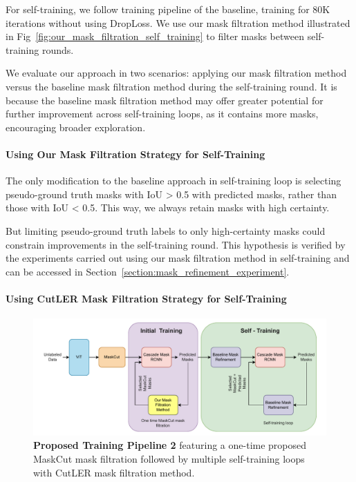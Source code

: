 For self-training, we follow training pipeline of the baseline, training for 80K iterations without using DropLoss. We use our mask filtration method illustrated in Fig~\ref{fig:our_mask_filtration_self_training} to filter masks between self-training rounds. 
 
We evaluate our approach in two scenarios: applying our mask filtration method versus the baseline mask filtration method during the self-training round. It is because the baseline mask filtration method may offer greater potential for further improvement across self-training loops, as it contains more masks, encouraging broader exploration.
 
\paragraph{Using Our Mask Filtration Strategy for Self-Training}
\label{para:our_mask_filtration}
The only modification to the baseline approach in self-training loop is selecting pseudo-ground truth masks with IoU > 0.5 with predicted masks, rather than those with IoU < 0.5. This way, we always retain masks with high certainty. 

But limiting pseudo-ground truth labels to only high-certainty masks could constrain improvements in the self-training round. This hypothesis is verified by the experiments carried out using our mask filtration method in self-training and can be accessed in Section~\ref{section:mask_refinement_experiment}.
 
\paragraph{Using CutLER Mask Filtration Strategy for Self-Training}
\begin{figure}
	\centering
	\includegraphics[width=1\textwidth]{Images/main/our_approach.pdf}
	\caption[\textbf{Proposed Training Pipeline 2}]{\textbf{Proposed Training Pipeline 2} featuring a one-time proposed MaskCut mask filtration followed by multiple self-training loops with CutLER mask filtration method.}
	\label{fig:proposed_training_new}
\end{figure}

